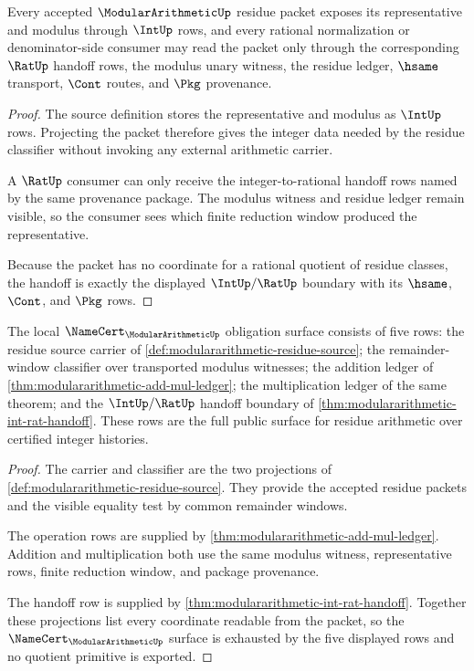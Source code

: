 \begin{theorem}
\label{thm:modulararithmetic-int-rat-handoff}
Every accepted $\ModularArithmeticUp$ residue packet exposes its representative and modulus through $\IntUp$ rows, and every rational normalization or denominator-side consumer may read the packet only through the corresponding $\RatUp$ handoff rows, the modulus unary witness, the residue ledger, $\hsame$ transport, $\Cont$ routes, and $\Pkg$ provenance.
\end{theorem}
\begin{proof}
The source definition stores the representative and modulus as $\IntUp$ rows. Projecting the packet therefore gives the integer data needed by the residue classifier without invoking any external arithmetic carrier.

A $\RatUp$ consumer can only receive the integer-to-rational handoff rows named by the same provenance package. The modulus witness and residue ledger remain visible, so the consumer sees which finite reduction window produced the representative.

Because the packet has no coordinate for a rational quotient of residue classes, the handoff is exactly the displayed $\IntUp/\RatUp$ boundary with its $\hsame$, $\Cont$, and $\Pkg$ rows.
\end{proof}

\begin{theorem}
\label{thm:modulararithmetic-namecert-obligation-surface}
The local $\NameCert_{\ModularArithmeticUp}$ obligation surface consists of five rows: the residue source carrier of \autoref{def:modulararithmetic-residue-source}; the remainder-window classifier over transported modulus witnesses; the addition ledger of \autoref{thm:modulararithmetic-add-mul-ledger}; the multiplication ledger of the same theorem; and the $\IntUp/\RatUp$ handoff boundary of \autoref{thm:modulararithmetic-int-rat-handoff}. These rows are the full public surface for residue arithmetic over certified integer histories.
\end{theorem}
\begin{proof}
The carrier and classifier are the two projections of \autoref{def:modulararithmetic-residue-source}. They provide the accepted residue packets and the visible equality test by common remainder windows.

The operation rows are supplied by \autoref{thm:modulararithmetic-add-mul-ledger}. Addition and multiplication both use the same modulus witness, representative rows, finite reduction window, and package provenance.

The handoff row is supplied by \autoref{thm:modulararithmetic-int-rat-handoff}. Together these projections list every coordinate readable from the packet, so the $\NameCert_{\ModularArithmeticUp}$ surface is exhausted by the five displayed rows and no quotient primitive is exported.
\end{proof}

